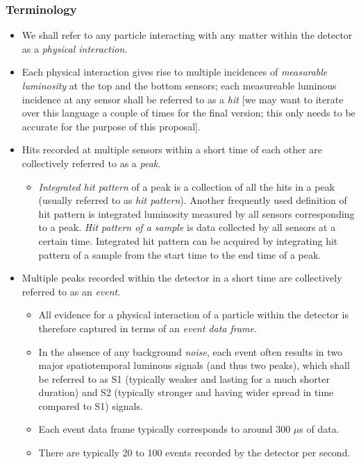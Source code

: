 \documentclass[]{article}
\providecommand{\tightlist}{%
  \setlength{\itemsep}{0pt}\setlength{\parskip}{0pt}}
\begin{document}
\subsubsection{Terminology}

\begin{itemize}
\tightlist
\item
  We shall refer to any particle interacting with any matter within the detector as a \emph{physical interaction}.
\item
  Each physical interaction gives rise to multiple incidences of \emph{measurable luminosity} at the top and the bottom sensors; each measureable luminous incidence at any sensor shall be referred to as a \emph{hit} {[}we may want to iterate over this language a couple of times for the final version; this only needs to be accurate for the purpose of this proposal{]}.
\item
  Hits recorded at multiple sensors within a short time of each other are collectively referred to as a \emph{peak}.
    \begin{itemize}
    \tightlist
    \item
    \emph{Integrated hit pattern} of a peak is a collection of all the hits in a peak (usually referred to as \emph{hit pattern}). Another frequently used definition of hit pattern is integrated luminosity measured by all sensors corresponding to a peak. \emph{Hit pattern of a sample} is data collected by all sensors at a certain time. Integrated hit pattern can be acquired by integrating hit pattern of a sample from the start time to the end time of a peak.     
    
    \end{itemize}
\item
  Multiple peaks recorded within the detector in a short time are collectively referred to as an \emph{event}.

  \begin{itemize}
  \tightlist
  \item
    All evidence for a physical interaction of a particle within the detector is therefore captured in terms of an \emph{event data frame}.
  \item
    In the absence of any background \emph{noise}, each event often results in two major spatiotemporal luminous signals (and thus two peaks), which shall be referred to as S1 (typically weaker and lasting for a much shorter duration) and S2 (typically stronger and having wider spread in time compared to S1) signals.
  \item
    Each event data frame typically corresponds to around \(300\) \(\mu\)s of data.
  \item
    There are typically 20 to 100 events recorded by the detector per second.
  \end{itemize}
\end{itemize}
\end{document}
